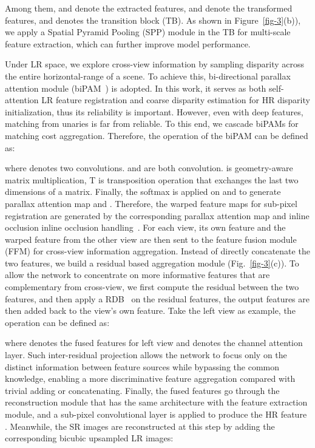 \documentclass[sigconf]{acmart}
\begin{document}
Among them,  and  denote the extracted features,  and  denote the transformed features, and  denotes the transition block (TB). As shown in Figure~\ref{fig-3}(b)), we apply a Spatial Pyramid Pooling (SPP) module in the TB for multi-scale feature extraction, which can further improve model performance.

Under LR space, we explore cross-view information by sampling disparity across the entire horizontal-range of a scene.
To achieve this, bi-directional parallax attention module (biPAM~\cite{Wang2020SymmetricPA}) is adopted. In this work, it serves as both self-attention LR feature registration and coarse disparity estimation for HR disparity initialization, thus its reliability is important. However, even with deep features, matching from unaries is far from reliable. To this end, 
we cascade  biPAMs for matching cost aggregation. Therefore, the operation of the  biPAM can be defined as:



where  denotes two  convolutions.  and  are both  convolution.  is geometry-aware matrix multiplication, T is transposition operation that exchanges the last two dimensions of a matrix. Finally, the softmax is applied on  and  to generate parallax attention map  and . Therefore, the warped feature maps  for sub-pixel registration are generated by the corresponding parallax attention map and inline occlusion inline occlusion handling~\cite{Wang2020SymmetricPA}. For each view, its own feature and the warped feature from the other view are then sent to the feature fusion module (FFM) for cross-view information aggregation. Instead of directly concatenate the two features, we build a residual based aggregation module (Fig.~\ref{fig-3}(c)). To allow the network to concentrate on more informative features that are complementary from cross-view, we first compute the residual between the two features, and then apply a RDB~\cite{Zhang2018ResidualDN} on the residual features, the output features are then added back to the view's own feature. Take the left view as example, the operation can be defined as:


where  denotes the fused features for left view and  denotes the channel attention layer. Such inter-residual projection allows the network to focus only on the distinct information between feature sources while bypassing the common knowledge, enabling a more discriminative feature aggregation compared with trivial adding or concatenating. Finally, the fused features  go through the reconstruction module that has the same architecture with the feature extraction module, and a sub-pixel convolutional layer is applied to produce the HR feature . Meanwhile, the SR images  are reconstructed at this step by adding the corresponding bicubic upsampled LR images: 
\end{document}
